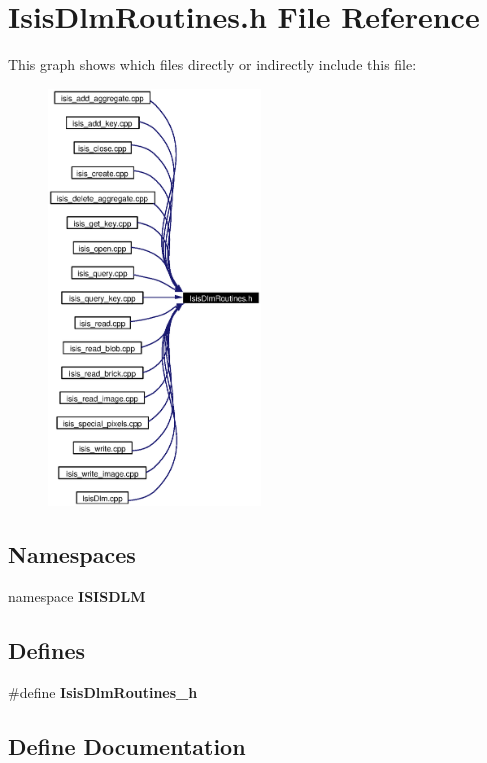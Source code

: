 \section{Isis\-Dlm\-Routines.h File Reference}
\label{IsisDlmRoutines_8h}


This graph shows which files directly or indirectly include this file:\begin{figure}[H]
\begin{center}
\leavevmode
\includegraphics[width=160pt]{IsisDlmRoutines_8h__dep__incl}
\end{center}
\end{figure}
\subsection*{Namespaces}
\begin{CompactItemize}
\item 
namespace {\bf ISISDLM}
\end{CompactItemize}
\subsection*{Defines}
\begin{CompactItemize}
\item 
\#define {\bf Isis\-Dlm\-Routines\_\-h}
\end{CompactItemize}


\subsection{Define Documentation}
